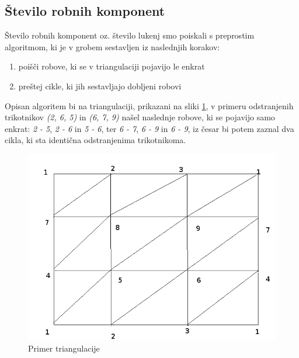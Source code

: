 \documentclass{article}
\begin{document}
\subsection{Število robnih komponent}
Število robnih komponent oz. število lukenj smo poiskali s preprostim algoritmom, ki je v grobem sestavljen iz naslednjih korakov:
\begin{enumerate}
\item poišči robove, ki se v triangulaciji pojavijo le enkrat
\item preštej cikle, ki jih sestavljajo dobljeni robovi
\end{enumerate}
Opisan algoritem bi na triangulaciji, prikazani na sliki \ref{triangulacija}, v primeru odstranjenih trikotnikov \textit{(2, 6, 5)} in \textit{(6, 7, 9)} našel naslednje robove, ki se pojavijo samo enkrat: \textit{2 - 5}, \textit{2 - 6} in \textit{5 - 6}, ter \textit{6 - 7}, \textit{6 - 9} in \textit{6 - 9}, iz česar bi potem zaznal dva cikla, ki sta identična odstranjenima trikotnikoma.
\begin{figure}[htb]
\begin{center}
\includegraphics[scale=0.35]{Triangulation.png}
\caption{Primer triangulacije}
\label{triangulacija}
\end{center}
\end{figure}
\end{document}

